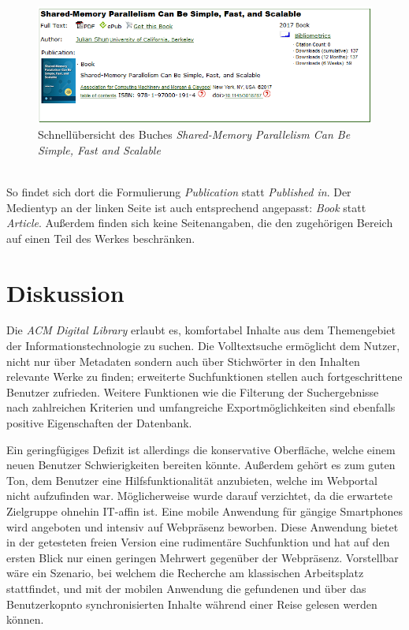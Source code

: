 \documentclass[
	ngerman,
	parskip=half,
	headsepline,
	fontsize=12pt,
	DIV=13,
	listof=leveldown,
	]{scrreprt}
\begin{document}
\ \\
\begin{figure}[ht]
\centering
\includegraphics[width=\textwidth]{img/seq.PNG}
\caption{Schnellübersicht des Buches \textit{Shared-Memory Parallelism Can Be Simple, Fast and Scalable}}
\end{figure}
\ \\
So findet sich dort die Formulierung \textit{Publication} statt \textit{Published in}. Der Medientyp an der linken Seite ist auch entsprechend angepasst: \textit{Book} statt \textit{Article}. Außerdem finden sich keine Seitenangaben, die den zugehörigen Bereich auf einen Teil des Werkes beschränken.


	\chapter{Diskussion}	
	
	Die \textsl{ACM Digital Library} erlaubt es, komfortabel Inhalte aus dem Themengebiet der Informationstechnologie zu suchen. Die Volltextsuche ermöglicht dem Nutzer, nicht nur über Metadaten sondern auch über Stichwörter in den Inhalten relevante Werke zu finden; erweiterte Suchfunktionen stellen auch fortgeschrittene Benutzer zufrieden. Weitere Funktionen wie die Filterung der Suchergebnisse nach zahlreichen Kriterien und umfangreiche Exportmöglichkeiten sind ebenfalls positive Eigenschaften der Datenbank. 
	
	Ein geringfügiges Defizit ist allerdings die konservative Oberfläche, welche einem neuen Benutzer Schwierigkeiten bereiten könnte. Außerdem gehört es zum guten Ton, dem Benutzer eine Hilfsfunktionalität anzubieten, welche im Webportal nicht aufzufinden war. Möglicherweise wurde darauf verzichtet, da die erwartete Zielgruppe ohnehin IT-affin ist.
	Eine mobile Anwendung für gängige Smartphones wird angeboten und intensiv auf Webpräsenz beworben. Diese Anwendung bietet in der getesteten freien Version eine rudimentäre Suchfunktion und hat auf den ersten Blick nur einen geringen Mehrwert gegenüber der Webpräsenz. Vorstellbar wäre ein Szenario, bei welchem die Recherche am klassischen Arbeitsplatz stattfindet, und mit der mobilen Anwendung die gefundenen und über das Benutzerkopnto synchronisierten Inhalte während einer Reise gelesen werden können.
	
\end{document}
